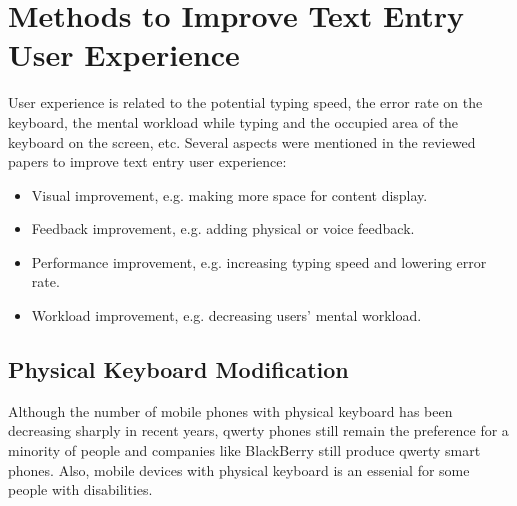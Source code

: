 \documentclass[11pt]{article}
\begin{document}
\section{Methods to Improve Text Entry User Experience}\label{section-improvement}
User experience is related to the potential typing speed, the error rate on the keyboard, the mental workload while typing and the occupied area of the keyboard on the screen, etc. Several aspects were mentioned in the reviewed papers to improve text entry user experience: 
\begin{itemize}
    \item Visual improvement, e.g. making more space for content display.
    \item Feedback improvement, e.g. adding physical or voice feedback.
    \item Performance improvement, e.g. increasing typing speed and lowering error rate.
    \item Workload improvement, e.g. decreasing users' mental workload.
\end{itemize}
\subsection{Physical Keyboard Modification}
Although the number of mobile phones with physical keyboard has been decreasing sharply in recent years, qwerty phones still remain the preference for a minority of people and companies like BlackBerry still produce qwerty smart phones. Also, mobile devices with physical keyboard is an essenial for some people with disabilities. 
\end{document}
